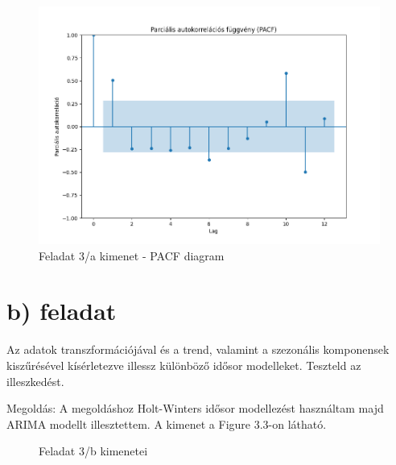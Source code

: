 \documentclass[11pt,a4paper,oneside]{report}
\begin{document}
\begin{figure}[!ht]
  \begin{center}
    \includegraphics[scale=0.4]{Figure_3.png}
    \caption{Feladat 3/a kimenet - PACF diagram}
    \label{fig:TexnicCenter}
  \end{center}
\end{figure}
\section{b) feladat}
Az adatok transzformációjával és a trend, valamint a szezonális komponensek kiszűrésével kísérletezve illessz különböző idősor modelleket. Teszteld az illeszkedést.

Megoldás:
A megoldáshoz Holt-Winters idősor modellezést használtam majd ARIMA modellt illesztettem.
A kimenet a Figure 3.3-on látható.

\begin{figure}%
  \centering
  \qquad
  \caption{Feladat 3/b kimenetei}%
  \label{fig:example}%
\end{figure}
\end{document}
